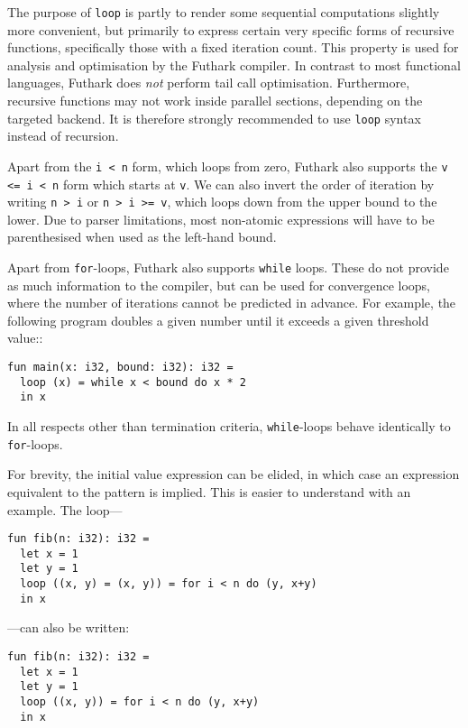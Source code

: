 \documentclass[11pt]{book}
\begin{document}
The purpose of \texttt{loop} is partly to render some sequential
computations slightly more convenient, but primarily to express
certain very specific forms of recursive functions, specifically those
with a fixed iteration count.  This property is used for analysis and
optimisation by the Futhark compiler.  In contrast to most functional
languages, Futhark does \textit{not} perform tail call optimisation.
Furthermore, recursive functions may not work inside parallel
sections, depending on the targeted backend.  It is therefore strongly
recommended to use \texttt{loop} syntax instead of recursion.

Apart from the \texttt{i < n} form, which loops from zero, Futhark
also supports the \texttt{v <= i < n} form which starts at \texttt{v}.
We can also invert the order of iteration by writing \texttt{n > i} or
\texttt{n > i >= v}, which loops down from the upper bound to the
lower.  Due to parser limitations, most non-atomic expressions will
have to be parenthesised when used as the left-hand bound.

Apart from \texttt{for}-loops, Futhark also supports \texttt{while}
loops.  These do not provide as much information to the compiler, but
can be used for convergence loops, where the number of iterations
cannot be predicted in advance.  For example, the following program
doubles a given number until it exceeds a given threshold value::

\begin{lstlisting}
fun main(x: i32, bound: i32): i32 =
  loop (x) = while x < bound do x * 2
  in x
\end{lstlisting}

In all respects other than termination criteria, \texttt{while}-loops
behave identically to \texttt{for}-loops.

For brevity, the initial value expression can be elided, in which case
an expression equivalent to the pattern is implied.  This is easier to
understand with an example.  The loop---

\begin{lstlisting}
fun fib(n: i32): i32 =
  let x = 1
  let y = 1
  loop ((x, y) = (x, y)) = for i < n do (y, x+y)
  in x
\end{lstlisting}

---can also be written:

\begin{lstlisting}
fun fib(n: i32): i32 =
  let x = 1
  let y = 1
  loop ((x, y)) = for i < n do (y, x+y)
  in x
\end{lstlisting}
\end{document}
